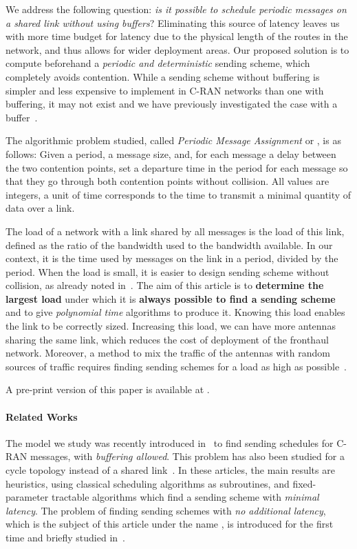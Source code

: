 \documentclass[pdflatex,sn-mathphys,iicol]{sn-jnl}%
\theoremstyle{thmstyleone}%
\theoremstyle{thmstyletwo}%
\theoremstyle{thmstylethree}%
\begin{document}
We address the following question: \emph{is it possible to schedule periodic messages on a shared link without using buffers}? Eliminating this source of latency leaves us with more time budget for latency due to the physical length of the routes in the network, and thus allows for wider deployment areas. Our proposed solution is to compute beforehand a \emph{periodic and deterministic} sending scheme, which completely avoids contention.  While a sending scheme without buffering is simpler and less expensive to implement in C-RAN networks than one with buffering, it may not exist and we have previously investigated the case with a buffer~\cite{barth2018deterministic}. 

The algorithmic problem studied, called \emph{Periodic Message Assignment} or \pma, is as follows: Given a period, a message size, and, for each message a delay between the two contention points, set a departure time in the period for each message so that they go through both contention points without collision. All values are integers, a unit of time corresponds to the time to transmit a minimal quantity of data over a link. 

The load of a network with a link shared by all messages is the load of this link, defined as the ratio of the bandwidth used to the bandwidth available. In our context, it is the time used by messages on the link in a period, divided by the period. When the load is small, it is easier to design sending scheme without collision, as already noted in~\cite{barth2018deterministic,guiraud2021deterministic}.
The aim of this article is to \textbf{determine the largest load} under which it is \textbf{always possible to find a sending scheme} and to give \emph{polynomial time} algorithms to produce it. 
Knowing this load enables the link to be correctly sized. Increasing this load, we can have more antennas sharing the same link, which reduces the cost of deployment of the fronthaul network. Moreover, a method to mix the traffic of the antennas with random sources of traffic requires finding sending schemes for a load as high as possible~\cite{guiraud2021deterministic}. 

A pre-print version of this paper is available at \cite{DBLP:journals/corr/abs-2002-07606}.


\paragraph*{Related Works}

The model we study was recently introduced in~\cite{barth2018deterministic,guiraud2021deterministic} to find sending schedules for C-RAN messages, with \emph{buffering allowed}. This problem has also been studied for a cycle topology instead of a shared link~\cite{Guir1905:Deterministic}. In these articles, the main results are heuristics, using classical scheduling algorithms as subroutines, and fixed-parameter tractable algorithms which find a sending scheme with \emph{minimal latency}. The problem of finding sending schemes with \emph{no additional latency}, which is the subject of this article under the name \pma, is introduced for the first time and briefly studied in~\cite{bartharxiv2018deterministic}.
\end{document}
